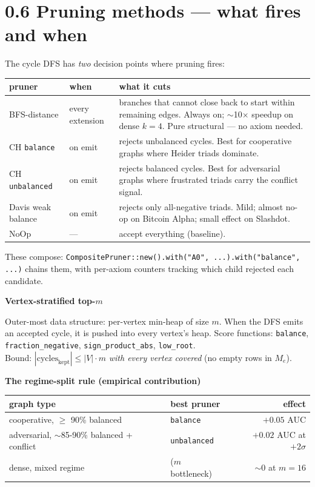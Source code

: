 \documentclass[11pt,a4paper]{article}
\newcommand{\code}[1]{\texttt{\small #1}}
\newcommand{\sect}[1]{\par\medskip\noindent\textbf{\color{deepblue}#1}\par\nopagebreak}
\begin{document}
\section*{0.6 Pruning methods --- what fires and when}

The cycle DFS has \emph{two} decision points where pruning fires:

\begin{center}
\begin{tabularx}{\textwidth}{l l X}
\toprule
\textbf{pruner} & \textbf{when} & \textbf{what it cuts} \\
\midrule
BFS-distance         & every extension &
  branches that cannot close back to start within remaining edges.
  Always on; $\sim$10$\times$ speedup on dense $k{=}4$. Pure
  structural --- no axiom needed. \\
CH \code{balance}    & on emit  &
  rejects unbalanced cycles. Best for cooperative graphs where
  Heider triads dominate. \\
CH \code{unbalanced} & on emit  &
  rejects balanced cycles. Best for adversarial graphs where
  frustrated triads carry the conflict signal. \\
Davis weak balance   & on emit  &
  rejects only all-negative triads. Mild; almost no-op on Bitcoin
  Alpha; small effect on Slashdot. \\
NoOp                 & ---       & accept everything (baseline). \\
\bottomrule
\end{tabularx}
\end{center}

These compose:
\code{CompositePruner::new().with("A0", ...).with("balance", ...)}
chains them, with per-axiom counters tracking which child rejected
each candidate.

\sect{Vertex-stratified top-$m$}
Outer-most data structure: per-vertex min-heap of size $m$. When the
DFS emits an accepted cycle, it is pushed into every vertex's heap.
Score functions: \code{balance}, \code{fraction\_negative},
\code{sign\_product\_abs}, \code{low\_root}.\\
Bound: $|\text{cycles}_{\text{kept}}| \le |V| \cdot m$ \emph{with
every vertex covered} (no empty rows in $M_e$).

\sect{The regime-split rule (empirical contribution)}

\begin{center}
\begin{tabular}{l l r}
\toprule
graph type                                        & best pruner          & effect \\
\midrule
cooperative, $\geq$ 90\% balanced                 & \code{balance}       & $+0.05$ AUC \\
adversarial, $\sim$85-90\% balanced + conflict    & \code{unbalanced}    & $+0.02$ AUC at $+2\sigma$ \\
dense, mixed regime                               & ($m$ bottleneck)     & $\sim 0$ at $m{=}16$ \\
\bottomrule
\end{tabular}
\end{center}
\end{document}
